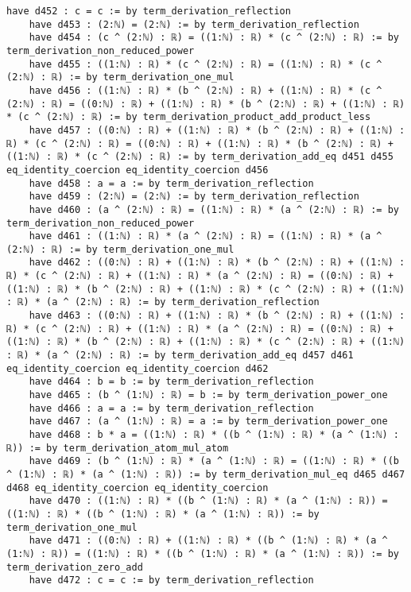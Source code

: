 \documentclass{article}
\begin{document}
\begin{tcolorbox}[colback=white!10, width=\linewidth]
\begin{lstlisting}[language=Lean4]
    have d452 : c = c := by term_derivation_reflection
    have d453 : (2:ℕ) = (2:ℕ) := by term_derivation_reflection
    have d454 : (c ^ (2:ℕ) : ℝ) = ((1:ℕ) : ℝ) * (c ^ (2:ℕ) : ℝ) := by term_derivation_non_reduced_power
    have d455 : ((1:ℕ) : ℝ) * (c ^ (2:ℕ) : ℝ) = ((1:ℕ) : ℝ) * (c ^ (2:ℕ) : ℝ) := by term_derivation_one_mul
    have d456 : ((1:ℕ) : ℝ) * (b ^ (2:ℕ) : ℝ) + ((1:ℕ) : ℝ) * (c ^ (2:ℕ) : ℝ) = ((0:ℕ) : ℝ) + ((1:ℕ) : ℝ) * (b ^ (2:ℕ) : ℝ) + ((1:ℕ) : ℝ) * (c ^ (2:ℕ) : ℝ) := by term_derivation_product_add_product_less
    have d457 : ((0:ℕ) : ℝ) + ((1:ℕ) : ℝ) * (b ^ (2:ℕ) : ℝ) + ((1:ℕ) : ℝ) * (c ^ (2:ℕ) : ℝ) = ((0:ℕ) : ℝ) + ((1:ℕ) : ℝ) * (b ^ (2:ℕ) : ℝ) + ((1:ℕ) : ℝ) * (c ^ (2:ℕ) : ℝ) := by term_derivation_add_eq d451 d455 eq_identity_coercion eq_identity_coercion d456
    have d458 : a = a := by term_derivation_reflection
    have d459 : (2:ℕ) = (2:ℕ) := by term_derivation_reflection
    have d460 : (a ^ (2:ℕ) : ℝ) = ((1:ℕ) : ℝ) * (a ^ (2:ℕ) : ℝ) := by term_derivation_non_reduced_power
    have d461 : ((1:ℕ) : ℝ) * (a ^ (2:ℕ) : ℝ) = ((1:ℕ) : ℝ) * (a ^ (2:ℕ) : ℝ) := by term_derivation_one_mul
    have d462 : ((0:ℕ) : ℝ) + ((1:ℕ) : ℝ) * (b ^ (2:ℕ) : ℝ) + ((1:ℕ) : ℝ) * (c ^ (2:ℕ) : ℝ) + ((1:ℕ) : ℝ) * (a ^ (2:ℕ) : ℝ) = ((0:ℕ) : ℝ) + ((1:ℕ) : ℝ) * (b ^ (2:ℕ) : ℝ) + ((1:ℕ) : ℝ) * (c ^ (2:ℕ) : ℝ) + ((1:ℕ) : ℝ) * (a ^ (2:ℕ) : ℝ) := by term_derivation_reflection
    have d463 : ((0:ℕ) : ℝ) + ((1:ℕ) : ℝ) * (b ^ (2:ℕ) : ℝ) + ((1:ℕ) : ℝ) * (c ^ (2:ℕ) : ℝ) + ((1:ℕ) : ℝ) * (a ^ (2:ℕ) : ℝ) = ((0:ℕ) : ℝ) + ((1:ℕ) : ℝ) * (b ^ (2:ℕ) : ℝ) + ((1:ℕ) : ℝ) * (c ^ (2:ℕ) : ℝ) + ((1:ℕ) : ℝ) * (a ^ (2:ℕ) : ℝ) := by term_derivation_add_eq d457 d461 eq_identity_coercion eq_identity_coercion d462
    have d464 : b = b := by term_derivation_reflection
    have d465 : (b ^ (1:ℕ) : ℝ) = b := by term_derivation_power_one
    have d466 : a = a := by term_derivation_reflection
    have d467 : (a ^ (1:ℕ) : ℝ) = a := by term_derivation_power_one
    have d468 : b * a = ((1:ℕ) : ℝ) * ((b ^ (1:ℕ) : ℝ) * (a ^ (1:ℕ) : ℝ)) := by term_derivation_atom_mul_atom
    have d469 : (b ^ (1:ℕ) : ℝ) * (a ^ (1:ℕ) : ℝ) = ((1:ℕ) : ℝ) * ((b ^ (1:ℕ) : ℝ) * (a ^ (1:ℕ) : ℝ)) := by term_derivation_mul_eq d465 d467 d468 eq_identity_coercion eq_identity_coercion
    have d470 : ((1:ℕ) : ℝ) * ((b ^ (1:ℕ) : ℝ) * (a ^ (1:ℕ) : ℝ)) = ((1:ℕ) : ℝ) * ((b ^ (1:ℕ) : ℝ) * (a ^ (1:ℕ) : ℝ)) := by term_derivation_one_mul
    have d471 : ((0:ℕ) : ℝ) + ((1:ℕ) : ℝ) * ((b ^ (1:ℕ) : ℝ) * (a ^ (1:ℕ) : ℝ)) = ((1:ℕ) : ℝ) * ((b ^ (1:ℕ) : ℝ) * (a ^ (1:ℕ) : ℝ)) := by term_derivation_zero_add
    have d472 : c = c := by term_derivation_reflection

\end{lstlisting}
\end{tcolorbox}
\end{document}
